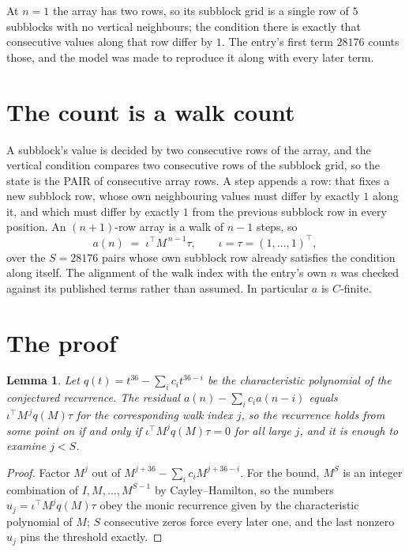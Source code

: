\documentclass[11pt,a4paper]{article}
\theoremstyle{plain}
\newtheorem{lemma}[theorem]{Lemma}
\theoremstyle{definition}
\begin{document}
At $n=1$ the array has two rows, so its subblock grid is a single row of $5$ subblocks with
no vertical neighbours; the condition there is exactly that consecutive values along that row
differ by $1$. The entry's first term $28176$ counts those, and the model was made to
reproduce it along with every later term.

\section{The count is a walk count}

A subblock's value is decided by two consecutive rows of the array, and the
vertical condition compares two consecutive rows of the subblock grid, so the state is the
PAIR of consecutive array rows. A step appends a row: that fixes a new subblock row, whose own
neighbouring values must differ by exactly $1$ along it, and which must differ by exactly
$1$ from the previous subblock row in every position. An $(n+1)$-row array is a walk of
$n-1$ steps, so
\[
a(n)\;=\;\iota^{\!\top}M^{\,n-1}\tau,\qquad\iota=\tau=(1,\dots,1)^{\!\top},
\]
over the $S=28176$ pairs whose own subblock row already satisfies the condition along itself.
The alignment of the walk index with the entry's own $n$ was checked against its published
terms rather than assumed. In particular $a$ is $C$-finite.

\section{The proof}

\begin{lemma}\label{lem:crit}
Let $q(t)=t^{36}-\sum_i c_it^{36-i}$ be the characteristic polynomial of the
conjectured recurrence. The residual $a(n)-\sum_ic_ia(n-i)$ equals
$\iota^{\!\top}M^{\,j}q(M)\tau$ for the corresponding walk index $j$, so the recurrence
holds from some point on if and only if $\iota^{\!\top}M^{j}q(M)\tau=0$ for all large $j$,
and it is enough to examine $j<S$.
\end{lemma}

\begin{proof}
Factor $M^{j}$ out of $M^{j+36}-\sum_ic_iM^{j+36-i}$. For the bound, $M^{S}$
is an integer combination of $I,M,\dots,M^{S-1}$ by Cayley--Hamilton, so the numbers
$u_j=\iota^{\!\top}M^{j}q(M)\tau$ obey the monic recurrence given by the characteristic
polynomial of $M$; $S$ consecutive zeros force every later one, and the last nonzero $u_j$
pins the threshold exactly.
\end{proof}
\end{document}
